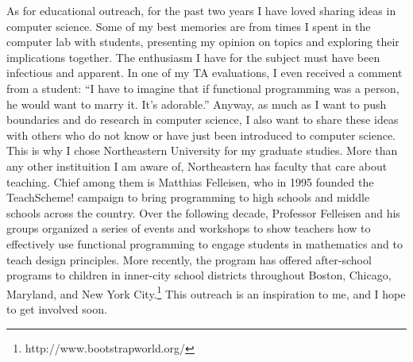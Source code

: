 \documentclass{article}
\begin{document}
As for educational outreach, for the past two years I have loved sharing ideas in computer science.
Some of my best memories are from times I spent in the computer lab with students, presenting my opinion on topics and exploring their implications together.
The enthusiasm I have for the subject must have been infectious and apparent.
In one of my TA evaluations, I even received a comment from a student: ``I have to imagine that if functional programming was a person, he would want to marry it. It's adorable.''
Anyway, as much as I want to push boundaries and do research in computer science, I also want to share these ideas with others who do not know or have just been introduced to computer science.
This is why I chose Northeastern University for my graduate studies.
More than any other instituition I am aware of, Northeastern has faculty that care about teaching.
Chief among them is Matthias Felleisen, who in 1995 founded the TeachScheme! campaign to bring programming to high schools and middle schools across the country.
Over the following decade, Professor Felleisen and his groups organized a series of events and workshops to show teachers how to effectively use functional programming to engage students in mathematics and to teach design principles.
More recently, the program has offered after-school programs to children in inner-city school districts throughout Boston, Chicago, Maryland, and New York City.\footnote{http://www.bootstrapworld.org/}
This outreach is an inspiration to me, and I hope to get involved soon.
\end{document}
